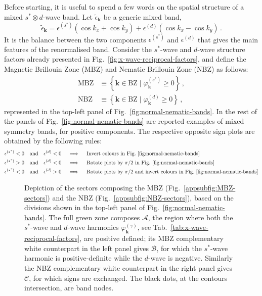 Before starting, it is useful to spend a few words on the spatial structure of a mixed $s^* \otimes d$-wave band. Let $\tilde{\epsilon}_\mathbf{k}$ be a generic mixed band,
\[
	\tilde{\epsilon}_\mathbf{k} = \epsilon^{(s^*)} (\cos k_x + \cos k_y) + \epsilon^{(d)} (\cos k_x - \cos k_y) \, .
\]
It is the balance between the two components $\epsilon^{(s^*)}$ and $\epsilon^{(d)}$ that gives the main features of the renormalised band. Consider the $s^*$-wave and $d$-wave structure factors already presented in Fig.~\ref{fig:x-wave-reciprocal-factors}, and define the Magnetic Brillouin Zone (MBZ) and Nematic Brillouin Zone (NBZ) as follows:
\begin{align}
	\mathrm{MBZ} &\equiv \left\lbrace
	\mathbf{k}\in\mathrm{BZ}
	\mid 
	\varphi_\mathbf{k}^{(s^*)} \ge 0
	\right\rbrace \, , \label{appeq:MBZ-def} \\
	\mathrm{NBZ} &\equiv \left\lbrace
	\mathbf{k}\in\mathrm{BZ}
	\mid 
	\varphi_\mathbf{k}^{(d)} \ge 0
	\right\rbrace  \, , \label{appeq:NBZ-def}
\end{align}
represented in the top-left panel of Fig.~\ref{fig:normal-nematic-bands}. In the rest of the panels of Fig.~\ref{fig:normal-nematic-bands} are reported examples of mixed symmetry bands, for positive components. The respective opposite sign plots are obtained by the following rules:
\[
\begin{aligned}
	\epsilon^{(s^*)} < 0 \qq{and} \epsilon^{(d)} < 0
	\quad&\implies\quad \text{Invert colours in Fig.~\ref{fig:normal-nematic-bands}} \\
	\epsilon^{(s^*)} > 0 \qq{and} \epsilon^{(d)} < 0
	\quad&\implies\quad \text{Rotate plots by $\pi/2$ in Fig.~\ref{fig:normal-nematic-bands}} \\
	\epsilon^{(s^*)} < 0 \qq{and} \epsilon^{(d)} > 0
	\quad&\implies\quad \text{Rotate plots by $\pi/2$ and invert colours in Fig.~\ref{fig:normal-nematic-bands}} \\
\end{aligned}
\]

\begin{figure}
	\centering
	\caption{Depiction of the sectors composing the MBZ (Fig.~\ref{appsubfig:MBZ-sectors}) and the NBZ (Fig.~\ref{appsubfig:NBZ-sectors}), based on the divisions shown in the top-left panel of Fig.~\ref{fig:normal-nematic-bands}. The full green zone composes $\mathcal{A}$, the region where both the $s^*$-wave and $d$-wave harmonics $\varphi_\mathbf{k}^{(\gamma)}$, see Tab.~\ref{tab:x-wave-reciprocal-factors}, are positive defined; its MBZ complementary white counterpart in the left panel gives $\mathcal{B}$, for which the $s^*$-wave harmonic is positive-definite while the $d$-wave is negative. Similarly the NBZ complementary white counterpart in the right panel gives $\mathcal{C}$, for which signs are exchanged. The black dots, at the contours intersection, are band nodes.}
	\label{appfig:BZ-sectors}
\end{figure}

